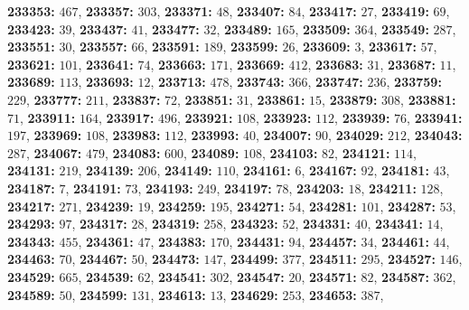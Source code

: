 \textsf{\bfseries 233353:} $467$, \textsf{\bfseries 233357:} $303$, \textsf{\bfseries 233371:} $48$, \textsf{\bfseries 233407:} $84$, \textsf{\bfseries 233417:} $27$, \textsf{\bfseries 233419:} $69$, \textsf{\bfseries 233423:} $39$, \textsf{\bfseries 233437:} $41$, \textsf{\bfseries 233477:} $32$, \textsf{\bfseries 233489:} $165$, \textsf{\bfseries 233509:} $364$, \textsf{\bfseries 233549:} $287$, \textsf{\bfseries 233551:} $30$, \textsf{\bfseries 233557:} $66$, \textsf{\bfseries 233591:} $189$, \textsf{\bfseries 233599:} $26$, \textsf{\bfseries 233609:} $3$, \textsf{\bfseries 233617:} $57$, \textsf{\bfseries 233621:} $101$, \textsf{\bfseries 233641:} $74$, \textsf{\bfseries 233663:} $171$, \textsf{\bfseries 233669:} $412$, \textsf{\bfseries 233683:} $31$, \textsf{\bfseries 233687:} $11$, \textsf{\bfseries 233689:} $113$, \textsf{\bfseries 233693:} $12$, \textsf{\bfseries 233713:} $478$, \textsf{\bfseries 233743:} $366$, \textsf{\bfseries 233747:} $236$, \textsf{\bfseries 233759:} $229$, \textsf{\bfseries 233777:} $211$, \textsf{\bfseries 233837:} $72$, \textsf{\bfseries 233851:} $31$, \textsf{\bfseries 233861:} $15$, \textsf{\bfseries 233879:} $308$, \textsf{\bfseries 233881:} $71$, \textsf{\bfseries 233911:} $164$, \textsf{\bfseries 233917:} $496$, \textsf{\bfseries 233921:} $108$, \textsf{\bfseries 233923:} $112$, \textsf{\bfseries 233939:} $76$, \textsf{\bfseries 233941:} $197$, \textsf{\bfseries 233969:} $108$, \textsf{\bfseries 233983:} $112$, \textsf{\bfseries 233993:} $40$, \textsf{\bfseries 234007:} $90$, \textsf{\bfseries 234029:} $212$, \textsf{\bfseries 234043:} $287$, \textsf{\bfseries 234067:} $479$, \textsf{\bfseries 234083:} $600$, \textsf{\bfseries 234089:} $108$, \textsf{\bfseries 234103:} $82$, \textsf{\bfseries 234121:} $114$, \textsf{\bfseries 234131:} $219$, \textsf{\bfseries 234139:} $206$, \textsf{\bfseries 234149:} $110$, \textsf{\bfseries 234161:} $6$, \textsf{\bfseries 234167:} $92$, \textsf{\bfseries 234181:} $43$, \textsf{\bfseries 234187:} $7$, \textsf{\bfseries 234191:} $73$, \textsf{\bfseries 234193:} $249$, \textsf{\bfseries 234197:} $78$, \textsf{\bfseries 234203:} $18$, \textsf{\bfseries 234211:} $128$, \textsf{\bfseries 234217:} $271$, \textsf{\bfseries 234239:} $19$, \textsf{\bfseries 234259:} $195$, \textsf{\bfseries 234271:} $54$, \textsf{\bfseries 234281:} $101$, \textsf{\bfseries 234287:} $53$, \textsf{\bfseries 234293:} $97$, \textsf{\bfseries 234317:} $28$, \textsf{\bfseries 234319:} $258$, \textsf{\bfseries 234323:} $52$, \textsf{\bfseries 234331:} $40$, \textsf{\bfseries 234341:} $14$, \textsf{\bfseries 234343:} $455$, \textsf{\bfseries 234361:} $47$, \textsf{\bfseries 234383:} $170$, \textsf{\bfseries 234431:} $94$, \textsf{\bfseries 234457:} $34$, \textsf{\bfseries 234461:} $44$, \textsf{\bfseries 234463:} $70$, \textsf{\bfseries 234467:} $50$, \textsf{\bfseries 234473:} $147$, \textsf{\bfseries 234499:} $377$, \textsf{\bfseries 234511:} $295$, \textsf{\bfseries 234527:} $146$, \textsf{\bfseries 234529:} $665$, \textsf{\bfseries 234539:} $62$, \textsf{\bfseries 234541:} $302$, \textsf{\bfseries 234547:} $20$, \textsf{\bfseries 234571:} $82$, \textsf{\bfseries 234587:} $362$, \textsf{\bfseries 234589:} $50$, \textsf{\bfseries 234599:} $131$, \textsf{\bfseries 234613:} $13$, \textsf{\bfseries 234629:} $253$, \textsf{\bfseries 234653:} $387$, 
